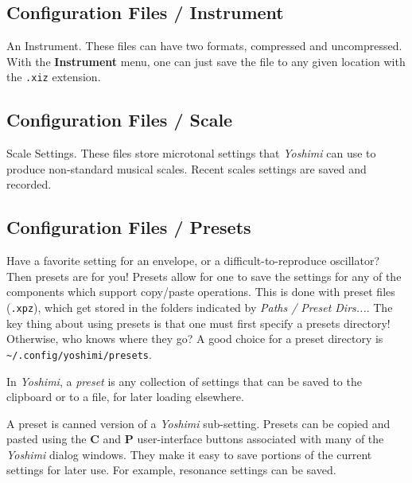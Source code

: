 \subsection{Configuration Files / Instrument}
\label{subsec:configuration_instrument}

   An Instrument.  These files can have two formats, compressed and
   uncompressed.
   With the \textbf{Instrument} menu, one can just save the file to any
   given location with the \texttt{.xiz} extension.

\subsection{Configuration Files / Scale}
\label{subsec:configuration_scale}

   Scale Settings.  These files store microtonal settings that \textsl{Yoshimi}
   can use to produce non-standard musical scales.  Recent scales settings are
   saved and recorded.

\subsection{Configuration Files / Presets}
\label{subsec:configuration_preset}

   Have a favorite setting for an envelope, or a difficult-to-reproduce
   oscillator? Then presets are for you! Presets allow for one to save the
   settings for any of the components which support copy/paste operations.
   This is done with preset files (\texttt{.xpz}), which get stored in the
   folders indicated by \textsl{Paths / Preset Dirs...}.
   The key thing about using presets is that one must first
   specify a presets directory!  Otherwise, who knows where they go?
   A good choice for a preset directory is
   \texttt{\textasciitilde/.config/yoshimi/presets}.

   In \textsl{Yoshimi}, a
   \textsl{preset} is any collection of settings that can be saved to the
   clipboard or to a file, for later loading elsewhere.

   A preset is canned version of a \textsl{Yoshimi} sub-setting.  Presets can be
   copied and pasted using the \textbf{C} and \textbf{P} user-interface buttons
   associated with many of the \textsl{Yoshimi} dialog windows.  They make it
   easy to save portions of the current settings for later use.  For example,
   resonance settings can be saved.

